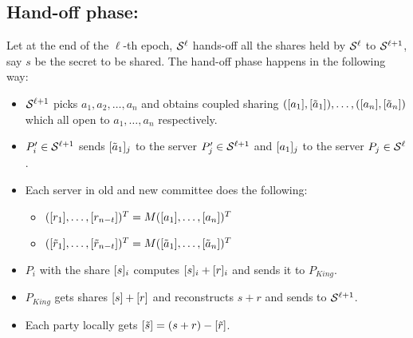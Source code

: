 \subsection{Hand-off phase: } Let at the end of the $\ell$-th epoch, $\mathcal{S}^{\ell}$ hands-off all the shares held by $\mathcal{S}^{\ell}$ to $\mathcal{S}^{\ell+1}$, say $s$ be the secret to be shared. The hand-off phase happens in the following way:
\begin{itemize}
	\item $\mathcal{S}^{\ell+1}$ picks $a_1, a_2, \ldots, a_n$ and obtains coupled sharing $([a_1], [\tilde{a}_1]), \ldots, ([a_n], [\tilde{a}_n])$ which all open to $a_1, \ldots, a_n$ respectively. 
	
	\item $P'_i\in \mathcal{S}^{\ell+1}$ sends $[\tilde{a}_1]_j$ to the server $P'_j\in \mathcal{S}^{\ell+1}$ and $[a_1]_j$ to the server $P_j\in\mathcal{S}^{\ell}$.
	
	\item Each server in old and new committee does the following: 
	\begin{itemize}
		\item $([r_1], \ldots, [r_{n-t}])^T = M([a_1], \ldots, [a_n])^T$
		\item $([\tilde{r}_1], \ldots, [\tilde{r}_{n-t}])^T = M([\tilde{a}_1], \ldots, [\tilde{a}_n])^T$
	\end{itemize}
	
	\item $P_i$ with the share $[s]_i$ computes $[s]_i+[r]_i$ and sends it to $P_{King}$.
	
	\item $P_{King}$ gets shares $[s]+[r]$ and reconstructs $s+r$ and sends to $\mathcal{S}^{\ell+1}$.
	
	\item Each party locally gets $[\tilde{s}] = (s+r)-[\tilde{r}]$.
\end{itemize}


